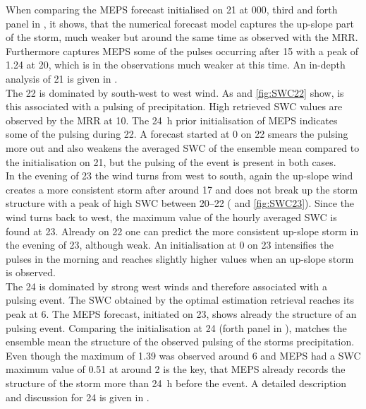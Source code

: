 When comparing the MEPS forecast initialised on \SI{21}{\dec} at 0\SI{00}{\UTC}, third and forth panel in , it shows, that the numerical forecast model captures the up-slope part of the storm, much weaker but around the same time as observed with the MRR. Furthermore captures MEPS some of the pulses occurring after \SI{15}{\UTC} with a peak of \SI{1.24}{\SWC} at \SI{20}{\UTC}, which is in the observations much weaker at this time. An in-depth analysis of \SI{21}{\dec} is given in .  %
\\
The \SI{22}{\dec} is dominated by south-west to west wind. As  and \ref{fig:SWC22} show, is this associated with a pulsing of precipitation. High retrieved SWC values are observed by the MRR at \SI{10}{\UTC}. The \SI{24}{\hour} prior initialisation of MEPS indicates some of the pulsing during \SI{22}{\dec}. A forecast started at \SI{0}{\UTC} on \SI{22}{\dec} smears the pulsing more out and also weakens the averaged SWC of the ensemble mean compared to the initialisation on \SI{21}{\dec}, but the pulsing of the event is present in both cases. 
\\
In the evening of \SI{23}{\dec} the wind turns from west to south, again the up-slope wind creates a more consistent storm after around \SI{17}{\UTC} and does not break up the storm structure with a peak of high SWC between \SIrange{20}{22}{\UTC} ( and \ref{fig:SWC23}). Since the wind turns back to west, the maximum value of the hourly averaged SWC is found at \SI{23}{\UTC}. Already on \SI{22}{\dec} one can predict the more consistent up-slope storm in the evening of \SI{23}{\dec}, although weak. An initialisation at \SI{0}{\UTC} on \SI{23}{\dec} intensifies the pulses in the morning and reaches slightly higher values when an up-slope storm is observed.
\\
The \SI{24}{\dec} is dominated by strong west winds and therefore associated with a pulsing event. The SWC obtained by the optimal estimation retrieval reaches its peak at \SI{6}{\UTC}. The MEPS forecast, initiated on \SI{23}{\dec}, shows already the structure of an pulsing event. Comparing the initialisation at \SI{24}{\dec} (forth panel in ), matches the ensemble mean the structure of the observed pulsing of the storms precipitation. Even though the maximum of \SI{1.39}{\SWC} was observed around \SI{6}{\UTC} and MEPS had a SWC maximum value of \SI{0.51}{\SWC} at around \SI{2}{\UTC} is the key, that MEPS already records the structure of the storm more than \SI{24}{\hour} before the event. A detailed description and discussion for \SI{24}{\dec} is given in .
